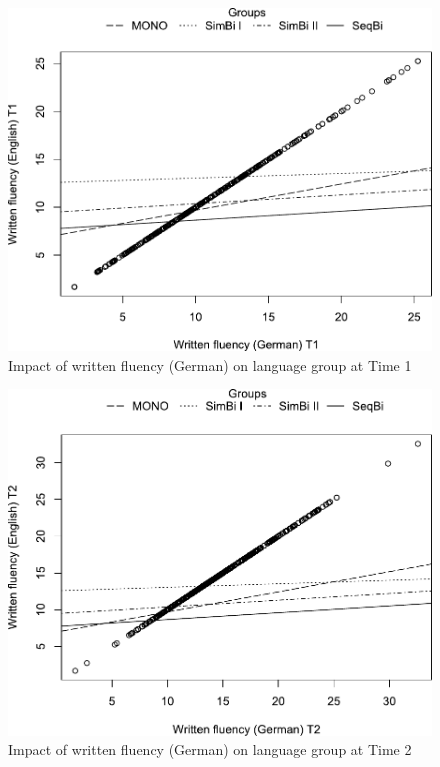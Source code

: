 \documentclass[output=paper,modfonts,nonflat,newtxmath]{langsci/langscibook}
\begin{document}
\begin{figure}%
\includegraphics[height=.45\textheight]{figures/PfenningerFigure7.pdf}
\caption{\label{fig:pfenninger:7}Impact of written fluency (German) on language group at Time 1}
\end{figure}

\begin{figure}%
\includegraphics[height=.45\textheight]{figures/PfenningerFigure8.pdf}
\caption{\label{fig:pfenninger:8} Impact of written fluency (German) on language group at Time 2}
\end{figure}
\end{document}
